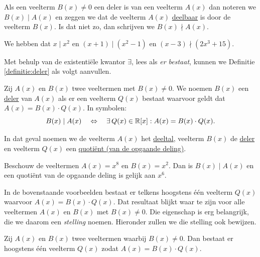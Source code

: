 \documentclass{ximera}
\begin{document}
Als een veelterm $B(x) \neq 0$ een deler is van een veelterm $A(x)$ dan noteren we $B(x) \mid A(x)$ en zeggen we dat de veelterm $A(x)$ \underline{deelbaar} is door de veelterm $B(x)$. Is dat niet zo, dan schrijven we $B(x) \nmid A(x)$. 

\begin{example} 
We hebben dat $x \mid x^2$ en $(x+1) \mid (x^2-1)$ en $(x-3) \nmid (2x^3+15)$.
\end{example} 

Met behulp van de existenti\"ele kwantor $\exists$, lees als {\em er bestaat}, kunnen we Definitie \ref{definitie:deler} als volgt aanvullen.

\begin{definition} 
Zij $A(x)$ en $B(x)$ twee veeltermen met $B(x) \neq 0$. We noemen $B(x)$ een \underline{deler} van $A(x)$ als er een veelterm $Q(x)$ bestaat waarvoor geldt dat $A(x) = B(x)\cdot Q(x)$. In symbolen:
\[
B(x) \mid A(x) \quad \Leftrightarrow \quad \exists \, Q(x) \in \mathbb{R}[x]: A(x) = B(x)\cdot Q(x).
\]
\end{definition} 

In dat geval noemen we de veelterm $A(x)$ het \underline{deeltal}, veelterm $B(x)$ de \underline{deler} en veelterm $Q(x)$ een \underline{quoti\"ent (van de opgaande deling)}. 

\begin{example} 
Beschouw de veeltermen $A(x) = x^8$ en $B(x) = x^2$. Dan is $B(x) \mid A(x)$ en een quoti\"ent van de opgaande deling is gelijk aan $x^6$. 
\end{example} 

In de bovenstaande voorbeelden bestaat er telkens hoogstens \'e\'en veelterm $Q(x)$ waarvoor $A(x) = B(x)\cdot Q(x)$. Dat resultaat blijkt waar te zijn voor alle veeltermen $A(x)$ en $B(x)$ met $B(x) \neq 0$. Die eigenschap is erg belangrijk, die we daarom een {\em stelling} noemen. Hieronder zullen we die stelling ook bewijzen. 

\begin{theorem} 
Zij $A(x)$ en $B(x)$ twee veeltermen waarbij $B(x) \neq 0$. Dan bestaat er hoogstens \'e\'en veelterm $Q(x)$ zodat $A(x) = B(x)\cdot Q(x)$. 
\end{theorem} 
\end{document}
